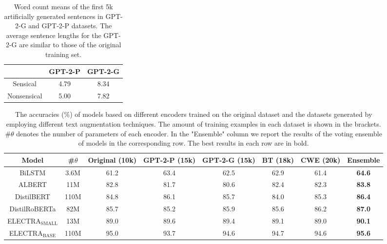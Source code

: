 \documentclass[10pt, a4paper]{article}
\begin{document}
\begin{table}[t]
    \caption{Word count means of the first 5k artificially generated sentences in GPT-2-G and GPT-2-P datasets. The average sentence lengths for the GPT-2-G are similar to those of the original training set.}
    \begin{center}
    \begin{tabular}{ccc}
        \toprule
        & GPT-2-P & GPT-2-G \\
        \midrule
      Sensical & 4.79 &  8.34 \\
      Nonsensical & 5.00 & 7.82 \\
      \bottomrule
    \end{tabular}
    \end{center}
    \label{tab:gptlen}
\end{table}


\begin{table}[ht]
      \caption{The accuracies (\%) of models based on different encoders trained on the original dataset and the datasets generated by employing different text augmentation techniques. The amount of training examples in each dataset is shown in the brackets. \#$\theta$ denotes the number of parameters of each encoder. In the "Ensemble" column we report the results of the voting ensemble of models in the corresponding row. The best results in each row are in bold.}
    \begin{center}
        
    \begin{tabular}{cccccccc}
        \toprule
         Model & \#$\theta$ & Original (10k) & GPT-2-P (15k) & GPT-2-G (15k) & BT (18k) & CWE (20k) & Ensemble \\
        \midrule
        BiLSTM & 3.6M & 61.2 & 63.4 & 62.5 & 62.9 & 61.4 & \textbf{64.6}\\
        ALBERT & 11M & 82.8 & 81.7 & 80.6 & 82.4 & 82.3 & \textbf{83.8} \\
        DistilBERT & 110M & 84.8 & 86.1 & 85.7 & 84.0 & 85.3 & \textbf{86.4} \\
        DistilRoBERTa & 82M & 85.7 & 85.2 & 85.9 & 85.6 & 86.2 & \textbf{87.0}\\
        ELECTRA$_\text{SMALL}$ & 13M & 89.0 & 89.6 & 89.4 & 89.1 & 89.0 & \textbf{90.1} \\
        ELECTRA$_\text{BASE}$ & 110M & 95.0 & 93.7 & 94.6 & 94.7 & 94.6 & \textbf{95.6} \\
        \bottomrule
    \end{tabular}
  \end{center}
    \label{table:results}
\end{table}
\end{document}

